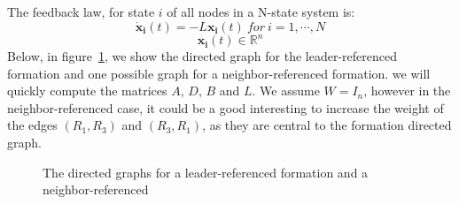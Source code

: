 \documentclass[a4paper, 12pt]{report}
\begin{document}
The feedback law, for state $i$ of all nodes in a N-state system is:
\[ \boldsymbol{\dot x_i}(t) = - L\boldsymbol{x_i}(t)\ for\ i=1, \cdots, N \]
\[\boldsymbol{x_i}(t) \in \mathbb{R}^n\]
Below, in figure~\ref{fig:graphs}, we show the directed graph for the leader-referenced formation and one possible graph for a neighbor-referenced formation. we will quickly compute the matrices $A$, $D$, $B$ and $L$. We assume $W = I_{n}$, however in the neighbor-referenced case, it could be a good interesting to increase the weight of the edges $(R_1, R_3)$ and $(R_3, R_1)$, as they are central to the formation directed graph.

\begin{figure}[h]
\centering
{}
\hspace{0.5cm}
\caption{The directed graphs for a leader-referenced formation and a neighbor-referenced}
\label{fig:graphs}
\end{figure}
\end{document}
